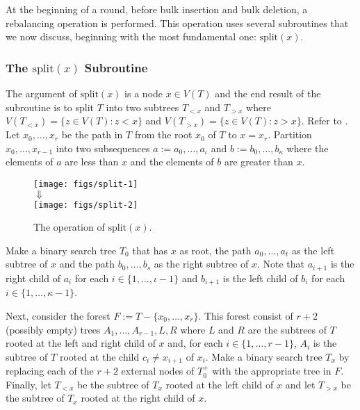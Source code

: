 \documentclass[kpfonts]{patmorin}
\begin{document}
At the beginning of a round, before bulk insertion and bulk deletion, a rebalancing operation is performed.  This operation uses several subroutines that we now discuss, beginning with the most fundamental one:  $\mathrm{split}(x)$.

\subsubsection{The $\mathrm{split}(x)$ Subroutine}

The argument of $\mathrm{split}(x)$ is a node $x\in V(T)$ and the end result of the subroutine is to split $T$ into two subtrees $T_{<x}$ and $T_{>x}$ where $V(T_{<x})=\{z\in V(T): z<x\}$ and $V(T_{>x})=\{z\in V(T): z>x\}$. Refer to .  Let $x_0,\ldots,x_r$ be the path in $T$ from the root $x_0$ of $T$ to $x=x_r$.  Partition $x_0,\ldots,x_{r-1}$ into two subsequences $a:=a_0,\ldots,a_\iota$ and $b:=b_0,\ldots,b_\kappa$ where the elements of $a$ are less than $x$ and the elements of $b$ are greater than $x$.

\begin{figure}
  \begin{center}
    \texttt{[image: figs/split-1]} \\[1ex]
    $\Downarrow$ \\[1ex]
    \texttt{[image: figs/split-2]}
  \end{center}
  \caption{The operation of $\mathrm{split}(x)$.}
\end{figure}

Make a binary search tree $T_0$ that has $x$ as root, the path $a_0,\ldots,a_t$ as the left subtree of $x$ and the path $b_0,\ldots,b_s$ as the right subtree of $x$.  Note that $a_{i+1}$ is the right child of $a_i$ for each $i\in\{1,\ldots,\iota-1\}$ and $b_{i+1}$ is the left child of $b_i$ for each $i\in\{1,\ldots,\kappa-1\}$. 

Next, consider the forest $F:=T-\{x_0,\ldots,x_r\}$. This forest consist of $r+2$ (possibly empty) trees $A_1,\ldots,A_{r-1},L,R$ where $L$ and $R$ are the subtrees of $T$ rooted at the left and right child of $x$ and, for each $i\in\{1,\ldots,r-1\}$, $A_i$ is the subtree of $T$ rooted at the child $c_i\neq x_{i+1}$ of $x_i$.  Make a binary search tree $T_x$ by replacing each of the $r+2$ external nodes of $T_0^+$ with the appropriate tree in $F$.  Finally, let $T_{<x}$ be the subtree of $T_x$ rooted at the left child of $x$ and let $T_{>x}$ be the subtree of $T_x$ rooted at the right child of $x$.
\end{document}
